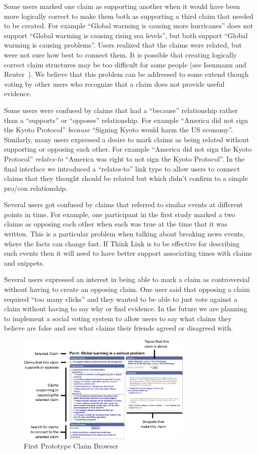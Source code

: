 \documentclass{chi2009}
\begin{document}
Some users marked one claim as supporting another when it would have been more logically correct to make them both as supporting a third claim that needed to be created. For example ``Global warming is causing more hurricanes'' does not support ``Global warming is causing rising sea levels'', but both support ``Global warming is causing problems''. Users realized that the claims were related, but were not sure how best to connect them. It is possible that creating logically correct claim structures may be too difficult for some people (see Isenmann and Reuter~\cite{Isenmann1997}). We believe that this problem can be addressed to some extend though voting by other users who recognize that a claim does not provide useful evidence.

Some users were confused by claims that had a ``because'' relationship rather than a ``supports'' or ``opposes'' relationship. For example ``America did not sign the Kyoto Protocol'' {\it because} ``Signing Kyoto would harm the US economy''. Similarly, many users expressed a desire to mark claims as being related without supporting or opposing each other. For example ``America did not sign the Kyoto Protocol'' {\it  relates-to} ``America was right to not sign the Kyoto Protocol''. In the final interface we introduced a ``relates-to'' link type to allow users to connect claims that they thought should be related but which didn't confirm to a simple pro/con relationship. 

Several users got confused by claims that referred to similar events at different points in time. 
For example, one participant in the first study marked a two claims as opposing each other when each was true at the time that it was written. This is a particular problem when talking about breaking news events, where the facts can change fast. If Think Link is to be effective for describing such events then it will need to have better support associating times with claims and snippets.

Several users expressed an interest in being able to mark a claim as controversial without having to create an opposing claim. One user said that opposing a claim required ``too many clicks'' and they wanted to be able to just vote against a claim without having to say why or find evidence. In the future we are planning to implement a social voting system to allow users to say what claims they believe are false and see what claims their friends agreed or disagreed with.

\begin{figure}[tb]
	\includegraphics[width=8.5cm]{../screenshots/oldpoint_diagram.png}
	\caption{First Prototype Claim Browser}
	\label{oldbrowser}
\end{figure}
\end{document}
